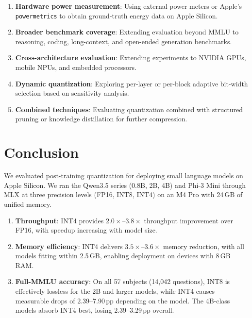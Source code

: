 \documentclass[journal]{IEEEtran}
\begin{document}
\begin{enumerate}[leftmargin=*,nosep]
    \item \textbf{Hardware power measurement}: Using external power meters or Apple's \texttt{powermetrics} to obtain ground-truth energy data on Apple Silicon.

    \item \textbf{Broader benchmark coverage}: Extending evaluation beyond MMLU to reasoning, coding, long-context, and open-ended generation benchmarks.

    \item \textbf{Cross-architecture evaluation}: Extending experiments to NVIDIA GPUs, mobile NPUs, and embedded processors.

    \item \textbf{Dynamic quantization}: Exploring per-layer or per-block adaptive bit-width selection based on sensitivity analysis.

    \item \textbf{Combined techniques}: Evaluating quantization combined with structured pruning or knowledge distillation for further compression.
\end{enumerate}

\section{Conclusion}

We evaluated post-training quantization for deploying small language models on Apple Silicon. We ran the Qwen3.5 series (0.8B, 2B, 4B) and Phi-3 Mini through MLX at three precision levels (FP16, INT8, INT4) on an M4 Pro with 24\,GB of unified memory.

\begin{enumerate}[leftmargin=*,nosep]
    \item \textbf{Throughput}: INT4 provides $2.0\times$--$3.8\times$ throughput improvement over FP16, with speedup increasing with model size.

    \item \textbf{Memory efficiency}: INT4 delivers $3.5\times$--$3.6\times$ memory reduction, with all models fitting within 2.5\,GB, enabling deployment on devices with 8\,GB RAM.

    \item \textbf{Full-MMLU accuracy}: On all 57 subjects (14,042 questions), INT8 is effectively lossless for the 2B and larger models, while INT4 causes measurable drops of 2.39--7.90\,pp depending on the model. The 4B-class models absorb INT4 best, losing 2.39--3.29\,pp overall.
\end{enumerate}
\end{document}
